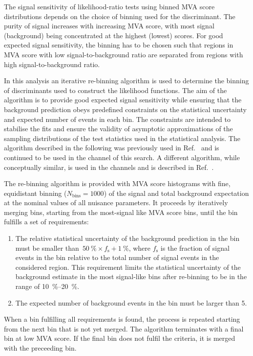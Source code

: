 The signal sensitivity of likelihood-ratio tests using binned MVA
score distributions depends on the choice of binning used for the
discriminant. The purity of signal increases with increasing MVA
score, with most signal (background) being concentrated at the highest
(lowest) scores. For good expected signal sensitivity, the binning has
to be chosen such that regions in MVA score with low
signal-to-background ratio are separated from regions with high
signal-to-background ratio.

In this analysis an iterative re-binning algorithm is used to
determine the binning of discriminants used to construct the
likelihood functions. The aim of the algorithm is to provide good
expected signal sensitivity while ensuring that the background
prediction obeys predefined constraints on the statistical uncertainty
and expected number of events in each bin. The constraints are
intended to stabilise the fits and ensure the validity of asymptotic
approximations of the sampling distributions of the test statistics
used in the statistical analysis. The algorithm described in the
following was previously used in Ref.~\cite{HIGG-2016-16-witherratum}
and is continued to be used in the \hadhad channel of this search. A
different algorithm, while conceptually similar, is used in the
\lephad channels and is described in Ref.~\cite{ATLAS-CONF-2021-030}.

The re-binning algorithm is provided with MVA score histograms with
fine, equidistant binning ($N_\text{bins} = 1000$) of the signal and
total background expectation at the nominal values of all nuisance
parameters. It proceeds by iteratively merging bins, starting from the
most-signal like MVA score bins, until the bin fulfills a set of
requirements:
\begin{enumerate}

\item The relative statistical uncertainty of the background
  prediction in the bin must be smaller
  than~\mbox{$\SI{50}{\percent} \times f_\text{s} +
    \SI{1}{\percent}$}, where $f_\text{s}$ is the fraction of signal
  events in the bin relative to the total number of signal events in
  the considered region.  This requirement limits the statistical
  uncertainty of the background estimate in the most signal-like bins
  after re-binning to be in the range of \SIrange{10}{20}{\percent}.

\item The expected number of background events in the bin must be
  larger than 5.

\end{enumerate}
When a bin fulfilling all requirements is found, the process is
repeated starting from the next bin that is not yet merged. The
algorithm terminates with a final bin at low MVA score. If the final
bin does not fulfil the criteria, it is merged with the preceeding
bin.

